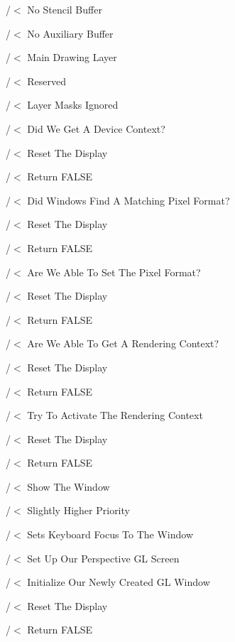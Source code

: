 /$<$ No Stencil Buffer

/$<$ No Auxiliary Buffer

/$<$ Main Drawing Layer

/$<$ Reserved

/$<$ Layer Masks Ignored

/$<$ Did We Get A Device Context?

/$<$ Reset The Display

/$<$ Return F\+A\+L\+SE

/$<$ Did Windows Find A Matching Pixel Format?

/$<$ Reset The Display

/$<$ Return F\+A\+L\+SE

/$<$ Are We Able To Set The Pixel Format?

/$<$ Reset The Display

/$<$ Return F\+A\+L\+SE

/$<$ Are We Able To Get A Rendering Context?

/$<$ Reset The Display

/$<$ Return F\+A\+L\+SE

/$<$ Try To Activate The Rendering Context

/$<$ Reset The Display

/$<$ Return F\+A\+L\+SE

/$<$ Show The Window

/$<$ Slightly Higher Priority

/$<$ Sets Keyboard Focus To The Window

/$<$ Set Up Our Perspective GL Screen

/$<$ Initialize Our Newly Created GL Window

/$<$ Reset The Display

/$<$ Return F\+A\+L\+SE

